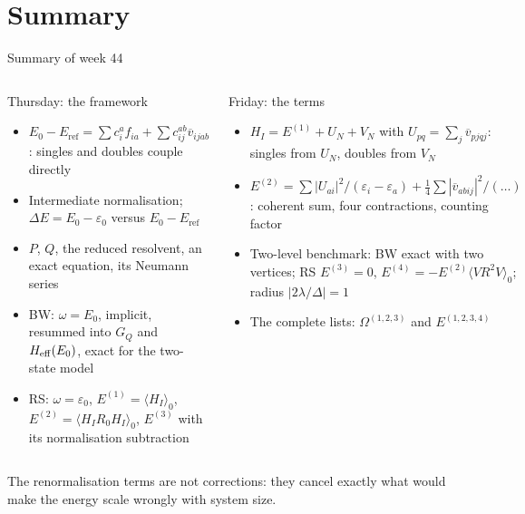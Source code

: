 \documentclass[aspectratio=169,10pt]{beamer}
\newcommand{\av}[1]{\langle #1\rangle_0}
\newcommand{\vbar}[4]{\overline v_{#1#2#3#4}}
\newcommand{\Eref}{E_{\mathrm{ref}}}
\begin{document}
\section{Summary}

\begin{frame}{Summary of week 44}
  \small
  \begin{columns}[T]
    \begin{block}{Thursday: the framework}
      \begin{itemize}
        \item \(E_0-\Eref=\sum c_i^af_{ia}+\sum c_{ij}^{ab}\vbar{i}{j}{a}{b}\): singles and doubles couple directly
        \item Intermediate normalisation; \(\Delta E=E_0-\varepsilon_0\) versus \(E_0-\Eref\)
        \item \(P\), \(Q\), the reduced resolvent, an exact equation, its Neumann series
        \item BW: \(\omega=E_0\), implicit, resummed into \(G_Q\) and \(H_{\rm eff}(E_0)\), exact for the two-state model
        \item RS: \(\omega=\varepsilon_0\), \(E^{(1)}=\av{H_I}\), \(E^{(2)}=\av{H_IR_0H_I}\), \(E^{(3)}\) with its normalisation subtraction
      \end{itemize}
    \end{block}
    \begin{block}{Friday: the terms}
      \begin{itemize}
        \item \(H_I=E^{(1)}+U_N+V_N\) with \(U_{pq}=\sum_j\vbar{p}{j}{q}{j}\): singles from \(U_N\), doubles from \(V_N\)
        \item \(E^{(2)}=\sum|U_{ai}|^2/(\varepsilon_i-\varepsilon_a)+\frac14\sum|\vbar{a}{b}{i}{j}|^2/(\ldots)\): coherent sum, four contractions, counting factor
        \item Two-level benchmark: BW exact with two vertices; RS \(E^{(3)}=0\), \(E^{(4)}=-E^{(2)}\av{VR^2V}\); radius \(|2\lambda/\Delta|=1\)
        \item The complete lists: \(\Omega^{(1,2,3)}\) and \(E^{(1,2,3,4)}\)
      \end{itemize}
    \end{block}
  \end{columns}
  \vspace{0.3em}
  \centering The renormalisation terms are not corrections: they cancel exactly what would make the energy scale wrongly with system size.
\end{frame}
\end{document}
